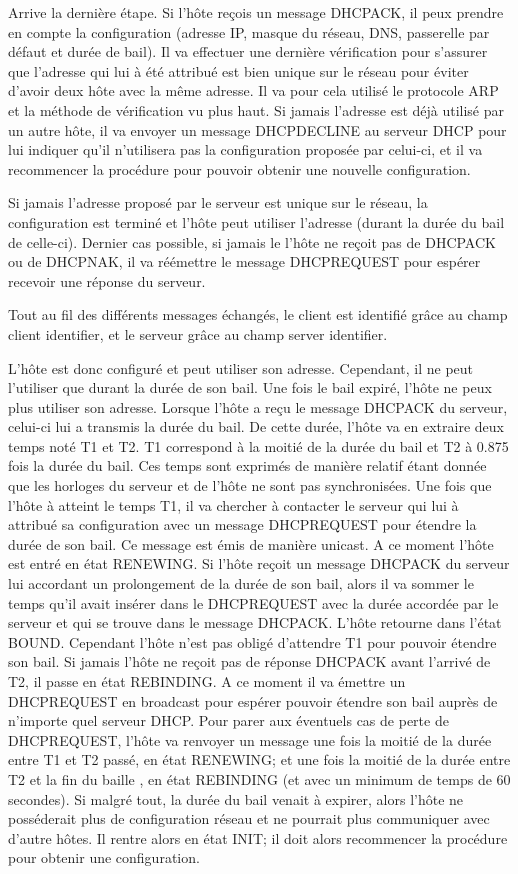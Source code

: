 \smallbreak
Arrive la dernière étape.
Si l'hôte reçois un message DHCPACK, il peux prendre en compte la
configuration (adresse IP, masque du réseau, DNS, passerelle par défaut et
durée de bail). Il va effectuer une dernière vérification pour s'assurer que
l'adresse qui lui à été attribué est bien unique sur le réseau pour éviter
d'avoir deux hôte avec la même adresse. Il va pour cela utilisé le protocole
ARP et la méthode de vérification vu plus haut. Si jamais l'adresse est déjà
utilisé par un autre hôte, il va envoyer un message DHCPDECLINE au serveur DHCP
pour lui indiquer qu'il n'utilisera pas la configuration proposée par celui-ci,
et il va recommencer la procédure pour pouvoir obtenir une nouvelle
configuration.

\smallbreak
Si jamais l'adresse proposé par le serveur est unique sur le réseau, la
configuration est terminé et l'hôte peut utiliser l'adresse (durant la durée du
bail de celle-ci).  Dernier cas possible, si jamais le l'hôte ne reçoit pas de
DHCPACK ou de DHCPNAK, il va réémettre le message DHCPREQUEST pour espérer
recevoir une réponse du serveur.

\smallbreak
Tout au fil des différents messages échangés, le client est identifié grâce au
champ client identifier, et le serveur grâce au champ server identifier.

L'hôte est donc configuré et peut utiliser son adresse. Cependant, il ne peut
l'utiliser que durant la durée de son bail. Une fois le bail expiré, l'hôte ne
peux plus utiliser son adresse. Lorsque l'hôte a reçu le message DHCPACK du
serveur, celui-ci lui a transmis la durée du bail. De cette durée, l'hôte va
en extraire deux temps noté T1 et T2. T1 correspond à la moitié de la durée du
bail et T2 à 0.875 fois la durée du bail. Ces temps sont exprimés de manière relatif
étant donnée que les horloges du serveur et de l'hôte ne sont pas
synchronisées.  Une fois que l'hôte à atteint le temps T1, il va chercher à
contacter le serveur qui lui à attribué sa configuration avec un message
DHCPREQUEST pour étendre la durée de son bail. Ce message est émis de manière
unicast. A ce moment l'hôte est entré en état RENEWING. Si l'hôte reçoit un
message DHCPACK du serveur lui accordant un prolongement de la durée de son
bail, alors il va sommer le temps qu'il avait insérer dans le DHCPREQUEST avec
la durée accordée par le serveur et qui se trouve dans le message DHCPACK.
L'hôte retourne dans l'état BOUND. Cependant l'hôte n'est pas obligé d'attendre
T1 pour pouvoir étendre son bail.  Si jamais l'hôte ne reçoit pas de réponse
DHCPACK avant l'arrivé de T2, il passe en état REBINDING. A ce moment il va
émettre un DHCPREQUEST en broadcast pour espérer pouvoir étendre son bail
auprès de n'importe quel serveur DHCP. Pour parer aux éventuels cas de perte de
DHCPREQUEST, l'hôte va renvoyer un message une fois la moitié de la durée entre
T1 et T2 passé, en état RENEWING; et une fois la moitié de la durée entre T2 et
la fin du baille , en état REBINDING (et avec un minimum de temps de 60
secondes).  Si malgré tout, la durée du bail venait à expirer, alors l'hôte ne
posséderait plus de configuration réseau et ne pourrait plus communiquer avec
d'autre hôtes. Il rentre alors en état INIT; il doit alors recommencer la
procédure pour obtenir une configuration.

